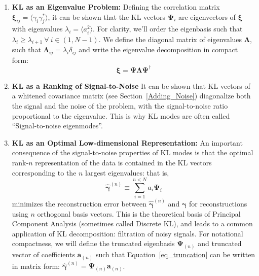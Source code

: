 \documentclass[twocolumn]{emulateapj}
\newcommand{\myvec}[1]{\boldsymbol{#1}}
\newcommand{\mymat}[1]{\boldsymbol{#1}}
\begin{document}
\begin{enumerate}
\item \textbf{KL as an Eigenvalue Problem:} 
  Defining the correlation matrix 
  $\myvec{\xi}_{ij} = \langle \gamma_i\gamma_j^*\rangle$, 
  it can be shown that the KL vectors $\myvec{\Psi}_i$ are eigenvectors 
  of $\myvec{\xi}$ with eigenvalues $\lambda_i = \langle a_i^2\rangle$.
  For clarity, we'll order the eigenbasis such that 
  $\lambda_i \ge \lambda_{i+1}\ \forall\ i\in(1,N-1)$.  We define the
  diagonal matrix of eigenvalues $\mymat{\Lambda}$, such that
  $\mymat{\Lambda}_{ij} = \lambda_i\delta_{ij}$
  and write the eigenvalue decomposition in compact form:
  \begin{equation}
    \mymat{\xi} = \mymat{\Psi}\mymat{\Lambda}\mymat{\Psi}^\dagger
  \end{equation}

\item \textbf{KL as a Ranking of Signal-to-Noise}
  It can be shown that KL vectors of a whitened covariance matrix (see
  Section~\ref{Adding_Noise})
  diagonalize both the signal and the noise of the problem, with the
  signal-to-noise ratio proportional to the eigenvalue.  This is
  why KL modes are often called ``Signal-to-noise eigenmodes''.

\item \textbf{KL as an Optimal Low-dimensional Representation:}
  An important consequence of the signal-to-noise properties of KL modes  
  is that the optimal rank-$n$ representation of the data is 
  contained in the KL vectors corresponding to the $n$ largest eigenvalues:
  that is,
  \begin{equation}
    \label{eq_truncation}
    \myvec{\hat\gamma}^{(n)}
    \equiv \sum_{i=1}^{n<N} a_i\myvec{\Psi}_i
  \end{equation}
  minimizes the reconstruction error between $\myvec{\hat\gamma}^{(n)}$ and 
  $\myvec\gamma$ for reconstructions using $n$ orthogonal basis vectors.
  This is the theoretical basis of Principal Component Analysis (sometimes
  called Discrete KL), and leads to a common application of KL 
  decomposition: filtration of noisy signals.  For notational compactness,
  we will define the truncated eigenbasis $\mymat{\Psi}_{(n)}$ and truncated
  vector of coefficients $\myvec{a}_{(n)}$ such that 
  Equation~\ref{eq_truncation} can be written in matrix form:
  $\myvec{\hat\gamma}^{(n)} = \mymat{\Psi}_{(n)}\myvec{a}_{(n)}$.
\end{enumerate}
 
\end{document}
